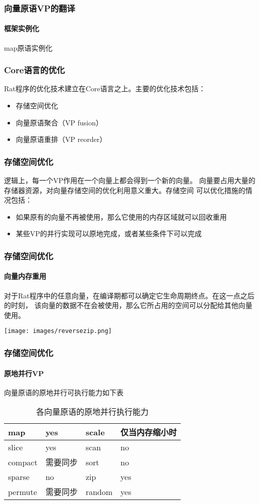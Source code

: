 \documentclass{beamer}
\begin{document}
\begin{frame}
  \frametitle{向量原语VP的翻译}
  \framesubtitle{框架实例化}
  map原语实例化
  
\end{frame}

\begin{frame}
  \frametitle{Core语言的优化}
  Rat程序的优化技术建立在Core语言之上。主要的优化技术包括：
  \begin{itemize}
    \item 存储空间优化
    \item 向量原语聚合（VP fusion）
    \item 向量原语重排（VP reorder）
  \end{itemize}
\end{frame}

\begin{frame}
  \frametitle{存储空间优化}
  逻辑上，每一个VP作用在一个向量上都会得到一个新的向量。
  向量要占用大量的存储器资源，对向量存储空间的优化利用意义重大。存储空间
  可以优化措施的情况包括：
  \pause
  \begin{itemize}
    \item 如果原有的向量不再被使用，那么它使用的内存区域就可以回收重用
    \item 某些VP的并行实现可以原地完成，或者某些条件下可以完成
  \end{itemize}
\end{frame}

\begin{frame}
  \frametitle{存储空间优化}
  \framesubtitle{向量内存重用}
  对于Rat程序中的任意向量，在编译期都可以确定它生命周期终点。在这一点之后的时刻，
  该向量的数据不在会被使用，那么它所占用的空间可以分配给其他向量使用。
  \pause
  
  \texttt{[image: images/reversezip.png]}
\end{frame}

\begin{frame}
  \frametitle{存储空间优化}
  \framesubtitle{原地并行VP}
  向量原语的原地并行可执行能力如下表
  \begin{table}
    \caption{各向量原语的原地并行执行能力}
    \begin{tabular}{|l|l||l|l|}
      \hline
      map & yes & scale & 仅当内存缩小时\\
      \hline
      slice & yes & scan & no\\
      \hline
      compact & 需要同步 & sort & no\\
      \hline
      sparse & no & zip & yes\\
      \hline
      permute & 需要同步 & random & yes\\
      \hline
    \end{tabular}
  \end{table}
\end{frame}
\end{document}
